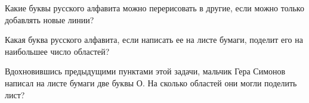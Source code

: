 ﻿
\begin{itemize}

\itA Какие буквы русского алфавита можно перерисовать в другие, если можно только добавлять новые линии?

\itB Какая буква русского алфавита, если написать ее на листе бумаги, поделит его на наибольшее число областей?

\itC Вдохновившись предыдущими пунктами этой задачи, мальчик Гера Симонов написал на листе бумаги две буквы О. На сколько областей они могли поделить лист?
\end{itemize}